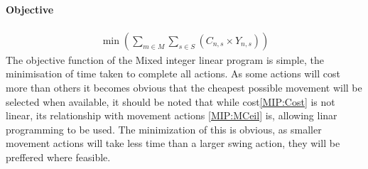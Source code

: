 \paragraph*{Objective}
\begin{align}
\label{MIP:OBJ}
\min\left(\sum_{m\in M}\sum_{s\in S} (C_{n,s}\times Y_{n,s})\right)
\end{align}
The objective function of the Mixed integer linear program is simple, the minimisation of time taken to complete all actions. As some actions will cost more than others it becomes obvious that the cheapest possible movement will be selected when available, it should be noted that while cost\ref{MIP:Cost} is not linear, its relationship with movement actions \ref{MIP:MCeil} is, allowing linar programming to be used. The minimization of this is obvious, as smaller movement actions will take less time than a larger swing action, they will be preffered where feasible. 
